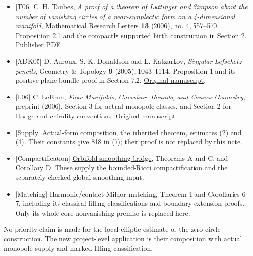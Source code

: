\documentclass[
  11pt,
]{article}
\providecommand{\tightlist}{%
  \setlength{\itemsep}{0pt}\setlength{\parskip}{0pt}}
\begin{document}
\begin{itemize}
\tightlist
\item
  {[}T06{]} C. H. Taubes, \emph{A proof of a theorem of Luttinger and
  Simpson about the number of vanishing circles of a near-symplectic
  form on a 4-dimensional manifold}, Mathematical Research Letters
  \textbf{13} (2006), no. 4, 557--570. Proposition 2.1 and the compactly
  supported birth construction in Section 2.
  \href{https://intlpress.com/api/bgcloud-front/resource/pdf/volume/1806605523900329985-1806605523900329985-9fa5106dca972fdc95f65c34eac2bf03.pdf}{Publisher
  PDF}.
\item
  {[}ADK05{]} D. Auroux, S. K. Donaldson and L. Katzarkov,
  \emph{Singular Lefschetz pencils}, Geometry \& Topology \textbf{9}
  (2005), 1043--1114. Proposition 1 and its positive-plane-bundle proof
  in Section 7.2. \href{https://arxiv.org/html/math/0410332}{Original
  manuscript}.
\item
  {[}L06{]} C. LeBrun, \emph{Four-Manifolds, Curvature Bounds, and
  Convex Geometry}, preprint (2006). Section 3 for actual monopole
  classes, and Section 2 for Hodge and chirality conventions.
  \href{https://arxiv.org/html/math/0611450}{Original manuscript}.
\item
  {[}Supply{]}
  \href{../mathematics/current/line1_composed_application.md}{Actual-form
  composition}, the inherited theorem, estimates (2) and (4). Their
  constants give 818 in (7); their proof is not replaced by this note.
\item
  {[}Compactification{]}
  \href{20260924_orbifold_smoothing_bridge.md}{Orbifold smoothing
  bridge}, Theorems A and C, and Corollary D. These supply the
  bounded-Ricci compactification and the separately checked global
  smoothing input.
\item
  {[}Matching{]}
  \href{20260924_harmonic_contact_milnor_matching.md}{Harmonic/contact
  Milnor matching}, Theorem 1 and Corollaries 6--7, including its
  classical filling classifications and boundary-extension proofs. Only
  its whole-core nonvanishing premise is replaced here.
\end{itemize}

No priority claim is made for the local elliptic estimate or the
zero-circle construction. The new project-level application is their
composition with actual monopole supply and marked filling
classification.
\end{document}
